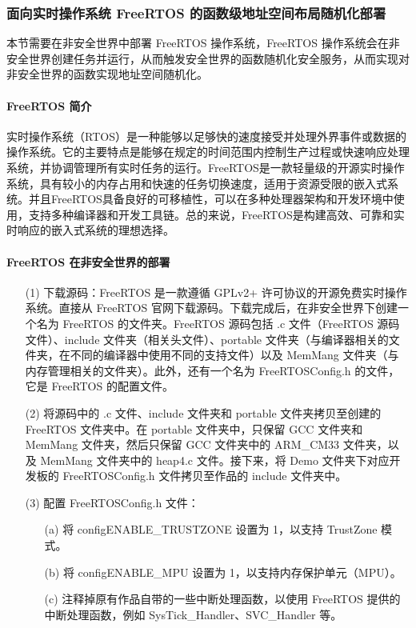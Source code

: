 \documentclass[UTF8,12pt,a4paper,twoside]{ctexart}
\numberwithin{figure}{section}
\begin{document}
\subsubsection{面向实时操作系统 FreeRTOS 的函数级地址空间布局随机化部署}
\par 本节需要在非安全世界中部署 FreeRTOS 操作系统，FreeRTOS 操作系统会在非安全世界创建任务并运行，从而触发安全世界的函数随机化安全服务，从而实现对非安全世界的函数实现地址空间随机化。
\paragraph{FreeRTOS 简介}
\par 实时操作系统（RTOS）是一种能够以足够快的速度接受并处理外界事件或数据的操作系统。它的主要特点是能够在规定的时间范围内控制生产过程或快速响应处理系统，并协调管理所有实时任务的运行。FreeRTOS是一款轻量级的开源实时操作系统，具有较小的内存占用和快速的任务切换速度，适用于资源受限的嵌入式系统。并且FreeRTOS具备良好的可移植性，可以在多种处理器架构和开发环境中使用，支持多种编译器和开发工具链。总的来说，FreeRTOS是构建高效、可靠和实时响应的嵌入式系统的理想选择。
\paragraph{FreeRTOS 在非安全世界的部署}
\begin{itemize}
    \item[(1)] 下载源码：FreeRTOS 是一款遵循 GPLv2+ 许可协议的开源免费实时操作系统。直接从 FreeRTOS 官网下载源码。下载完成后，在非安全世界下创建一个名为 FreeRTOS 的文件夹。FreeRTOS 源码包括 .c 文件（FreeRTOS 源码文件）、include 文件夹（相关头文件）、portable 文件夹（与编译器相关的文件夹，在不同的编译器中使用不同的支持文件）以及 MemMang 文件夹（与内存管理相关的文件夹）。此外，还有一个名为 FreeRTOSConfig.h 的文件，它是 FreeRTOS 的配置文件。
        
    \item[(2)] 将源码中的 .c 文件、include 文件夹和 portable 文件夹拷贝至创建的 FreeRTOS 文件夹中。在 portable 文件夹中，只保留 GCC 文件夹和 MemMang 文件夹，然后只保留 GCC 文件夹中的 ARM\_CM33 文件夹，以及 MemMang 文件夹中的 heap4.c 文件。接下来，将 Demo 文件夹下对应开发板的 FreeRTOSConfig.h 文件拷贝至作品的 include 文件夹中。
        
    \item[(3)] 配置 FreeRTOSConfig.h 文件：
        \begin{itemize}
            \item[(a)] 将 configENABLE\_TRUSTZONE 设置为 1，以支持 TrustZone 模式。
            \item[(b)] 将 configENABLE\_MPU 设置为 1，以支持内存保护单元（MPU）。
            \item[(c)] 注释掉原有作品自带的一些中断处理函数，以使用 FreeRTOS 提供的中断处理函数，例如 SysTick\_Handler、SVC\_Handler 等。
        \end{itemize}
\end{itemize}
\end{document}
